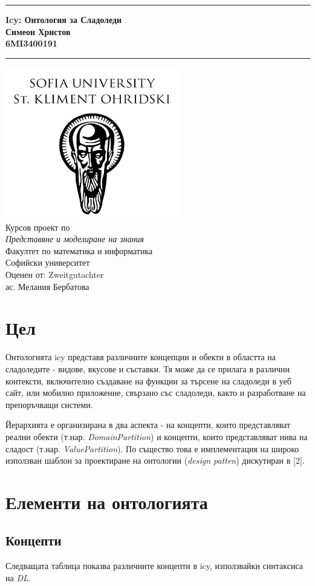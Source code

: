 \documentclass[12pt]{article}
\newcommand{\JMUTitle}[9]{

  \thispagestyle{empty}
  \vspace*{\stretch{1}}
  {\parindent0cm
  \rule{\linewidth}{.7ex}}
  \begin{flushright}
    \vspace*{\stretch{1}}
    \sffamily\bfseries\Huge
    #1\\
    \vspace*{\stretch{1}}
    \sffamily\bfseries\large
    #2\\
    \vspace*{\stretch{1}}
    \sffamily\bfseries\small
    #3
  \end{flushright}
  \rule{\linewidth}{.7ex}

  \vspace*{\stretch{1}}
  \begin{center}
    \includegraphics[width=3in]{./images/logo.png} \\
    \vspace*{\stretch{1}}
    \Large Курсов проект по \\ \textit{Представяне и моделиране на знания} \\

    \vspace*{\stretch{2}}
    \large Факултет по математика и информатика\\
    \large Софийски университет\\
    
    \vspace*{\stretch{1}}
    \large Оценен от:  #8 \\[1mm]
    
    \vspace*{\stretch{1}}
    \large #7 \\

  \end{center}
}
\begin{document}
  

  \JMUTitle
      {Icy: Онтология за Сладоледи}
      {Симеон Христов}
      {6MI3400191}
      
      {Wirtschaftswissenschaftlichen Fakultät}  %
      {W"urzburg 2018}                          %
      {Януари 2023}                              %
      {ас. Мелания Бербатова}               %
      {Zweitgutachter}                          %

  \clearpage

\tableofcontents

\clearpage


\section{Цел} 

    Онтологията icy представя различните концепции и обекти в областта на сладоледите - видове, вкусове и съставки. Тя може да се прилага в различни контексти, включително създаване на
    функции за търсене на сладоледи в уеб сайт, или мобилно приложение, свързано със
    сладоледи, както и разработване на препоръчващи системи.
    
    \vspace{1em}
    
    Йерархията е организирана в два аспекта - на концепти, които представляват реални обекти (т.нар. \textit{DomainPartition}) и концепти, които представляват нива на сладост (т.нар. \textit{ValuePartition}). По същество това е имплементация на широко използван шаблон за проектиране на онтологии (\textit{design patten}) дискутиран в [2].


\section{Елементи на онтологията}

    \subsection{Концепти}
        
        Следващата таблица показва различните концепти в icy, използвайки синтаксиса на \textit{DL}.
\end{document}
